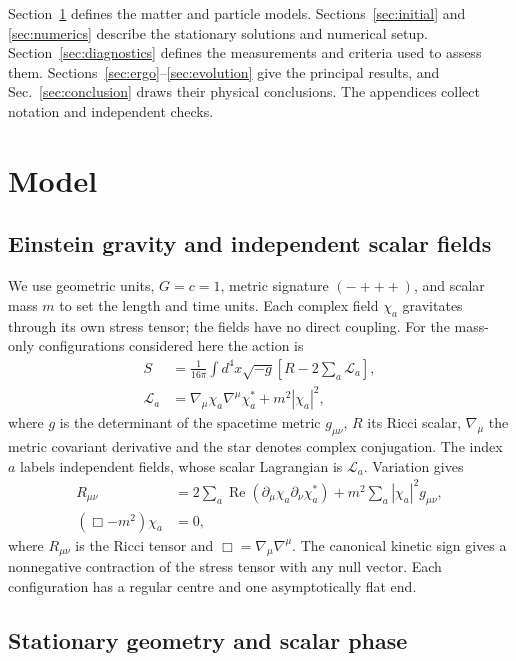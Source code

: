 \documentclass[10pt,twocolumn,floatfix,aps,prd,superscriptaddress,nofootinbib]{revtex4-2}
\begin{document}
Section~\ref{sec:model} defines the matter and particle models.
Sections~\ref{sec:initial} and \ref{sec:numerics} describe the stationary
solutions and numerical setup. Section~\ref{sec:diagnostics} defines the
measurements and criteria used to assess them. Sections~\ref{sec:ergo}--\ref{sec:evolution}
give the principal results, and Sec.~\ref{sec:conclusion} draws their physical
conclusions. The appendices collect notation and independent checks.

\section{Model}
\label{sec:model}

\subsection{Einstein gravity and independent scalar fields}

We use geometric units, $G=c=1$, metric signature $(-+++)$, and scalar mass
$m$ to set the length and time units. Each complex field $\chi_a$ gravitates
through its own stress tensor; the fields have no direct coupling.
For the mass-only configurations considered here the action is
\begin{equation}
 \begin{split}
 S&=\frac{1}{16\pi}\int d^4x\sqrt{-g}
       \left[R-2\sum_a\mathcal{L}_a\right],\\
 \mathcal{L}_a&=\nabla_\mu\chi_a\nabla^\mu\chi_a^*+m^2|\chi_a|^2,
 \end{split}
 \label{eq:action}
\end{equation}
where $g$ is the determinant of the spacetime metric $g_{\mu\nu}$, $R$ its
Ricci scalar, $\nabla_\mu$ the metric covariant derivative and the star denotes
complex conjugation. The index $a$ labels independent fields, whose scalar
Lagrangian is $\mathcal{L}_a$. Variation gives
\begin{align}
 R_{\mu\nu}&=2\sum_a\operatorname{Re}
 (\partial_\mu\chi_a\partial_\nu\chi_a^*)
       +m^2\sum_a|\chi_a|^2g_{\mu\nu},\label{eq:einstein}\\
 (\Box-m^2)\chi_a&=0,\label{eq:kg}
\end{align}
where $R_{\mu\nu}$ is the Ricci tensor and
$\Box=\nabla_\mu\nabla^\mu$. The canonical kinetic sign gives a nonnegative
contraction of the stress tensor with any null vector. Each configuration
has a regular centre and one asymptotically flat end.

\subsection{Stationary geometry and scalar phase}
\end{document}
